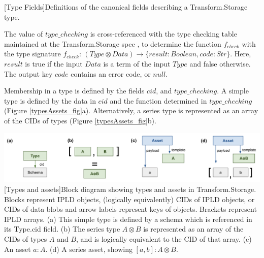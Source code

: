\documentclass[9pt, oneside]{article}   	%
\begin{document}
\begin{multicols}{2}
[Type Fields]{Definitions of the canonical fields describing a Transform.Storage type.}
\label{typeFields}
\setlength{\parindent}{.5 cm}
\vspace{.25 cm}

The value of $type\_checking$ is cross-referenced with the type checking table maintained at the Transform.Storage spec \cite{transformSpec}, to determine the function $f_{check}$ with the type signature $f_{check}$: $(Type \otimes Data) \rightarrow \{result: Boolean, code: Str\}$. Here, $result$ is true if the input $Data$ is a term of the input $Type$ and false otherwise. The output key $code$ contains an error code, or $null$.

Membership in a type is defined by the fields $cid$, and $type\_checking$. A simple type is defined by the data in $cid$ and the function determined in $type\_checking$ (Figure \ref{typesAssets_fig}a). Alternatively, a series type is represented as an array of the CIDs of types (Figure \ref{typesAssets_fig}b). 

\end{multicols}
\begin{center}
\includegraphics[width=1\columnwidth]{fig_types_assets_20230802}
[Types and assets]{Block diagram showing types and assets in Transform.Storage. Blocks represent IPLD objects, (logically equivalently) CIDs of IPLD objects, or CIDs of data blobs and arrow labels represent keys of objects. Brackets represent IPLD arrays. (a) This simple type is defined by a schema which is referenced in its Type.cid field. (b) The series type $A \otimes B$ is represented as an array of the CIDs of types $A$ and $B$, and is logically equivalent to the CID of that array. (c) An asset $a : A$. (d) A series asset, showing $[a, b] : A \otimes B$.}
\label{typesAssets_fig}
\end{center}
\end{document}
